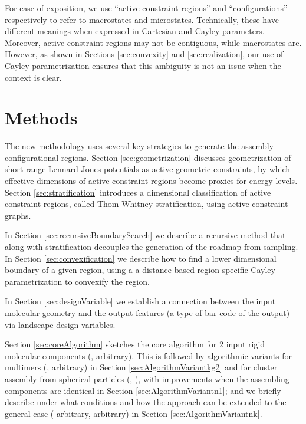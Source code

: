 \documentclass[]{article}
\begin{document}
\vspace{0.5cm}

 For ease of exposition, we use 
``active constraint regions'' and ``configurations'' respectively to refer to
macrostates and microstates. Technically, these have different meanings when
expressed in Cartesian and Cayley parameters. Moreover, active constraint
regions may not be contiguous, while macrostates are. However, as shown in Sections
\ref{sec:convexity} and \ref{sec:realization}, our use of Cayley
parametrization ensures that this ambiguity is not an issue when the context
is clear.

 \section{Methods}
\label{sec:methods}
The new methodology uses several key strategies to generate the assembly
configurational regions. Section \ref{sec:geometrization} discusses
geometrization of short-range Lennard-Jones potentials as active geometric
constraints, by which effective dimensions of active constraint regions become
proxies for energy levels. Section \ref{sec:stratification} introduces a
dimensional classification of active constraint regions, called Thom-Whitney
stratification, using active constraint graphs.

In Section \ref{sec:recursiveBoundarySearch} we describe a recursive method
that along with stratification decouples the generation of the roadmap from
sampling.  In Section \ref{sec:convexification} we describe how to find  a
lower dimensional boundary of a given region, using a a distance based
region-specific Cayley parametrization to convexify the region.

In Section \ref{sec:designVariable} we establish a connection between the input
molecular geometry and the output features (a type of bar-code of the output)
via landscape design variables.

Section \ref{sec:coreAlgorithm} sketches the core algorithm for 2 input rigid
molecular components (,  arbitrary). This is followed by algorithmic
variants for multimers (,  arbitrary) in Section
\ref{sec:AlgorithmVariantkg2} and for cluster assembly from spherical particles
(, ), with improvements when the assembling components are
identical in Section \ref{sec:AlgorithmVariantn1}; and we briefly describe
under what conditions and how the approach can be extended to the general case
( arbitrary,  arbitrary) in Section \ref{sec:AlgorithmVariantnk}.
\end{document}

